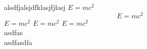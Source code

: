 \documentclass[
 ngerman,preview]{standalone}
\begin{document}
 alsdfjalsjdfklasjfjlasj
 $\displaystyle E = m c ^2 $
 $$\displaystyle E = m c ^2 $$
 $\displaystyle E = m c ^2 $ $\displaystyle E = m c ^2 $ $\displaystyle E = m c ^2 $
 \\
 asdfas
	\\
 asdfasdfa
\end{document}
